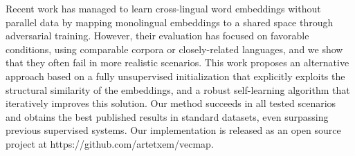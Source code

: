 Recent work has managed to learn cross-lingual word embeddings without parallel data by mapping monolingual embeddings to a shared space through adversarial training. However, their evaluation has focused on favorable conditions, using comparable corpora or closely-related languages, and we show that they often fail in more realistic scenarios. This work proposes an alternative approach based on a fully unsupervised initialization that explicitly exploits the structural similarity of the embeddings, and a robust self-learning algorithm that iteratively improves this solution. Our method succeeds in all tested scenarios and obtains the best published results in standard datasets, even surpassing previous supervised systems. Our implementation is released as an open source project at https://github.com/artetxem/vecmap.
